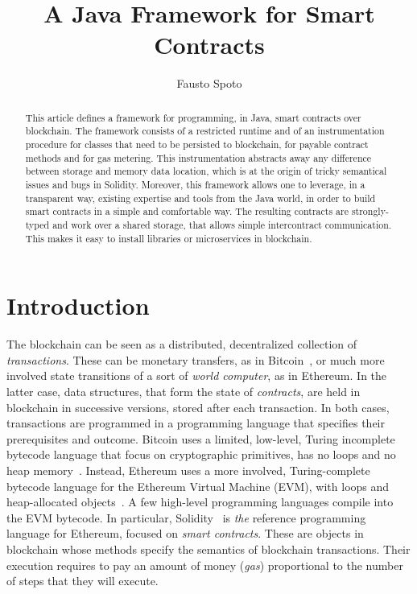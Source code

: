 \documentclass[10pt]{llncs}
\begin{document}
\title{
  A Java Framework for Smart Contracts}

\author{Fausto Spoto}


\maketitle

\begin{abstract}
  This article defines a framework for programming, in Java, smart contracts
  over blockchain.
  The framework consists of a restricted runtime and of an instrumentation
  procedure for classes that need to be persisted to blockchain,
  for payable contract methods and for gas metering.
  This instrumentation
  abstracts away any difference between storage and memory data location,
  which is at the origin of tricky semantical issues and bugs in Solidity.
  Moreover, this framework allows one to leverage, in a transparent way,
  existing expertise and tools from the Java world, in order to build
  smart contracts in a simple and comfortable way. The resulting contracts
  are strongly-typed and work over a shared storage, that allows simple
  intercontract communication.
  This makes it easy to install libraries
  or microservices in blockchain.
\end{abstract}

\section{Introduction}\label{sec:introduction}

The blockchain can be seen as a distributed, decentralized
collection of \emph{transactions}. These can be
monetary transfers, as in Bitcoin~\cite{Nakamoto08}, or much more
involved state transitions
of a sort of \emph{world computer}, as in Ethereum.
In the latter case, data structures, that form the state of \emph{contracts},
are held in blockchain in successive versions,
stored after each transaction. In both cases, transactions are
programmed in a programming language that specifies their prerequisites
and outcome. Bitcoin uses a limited, low-level,
Turing incomplete bytecode language that focus
on cryptographic primitives, has no loops and
no heap memory~\cite{Antonopoulos17}.
Instead, Ethereum uses a more involved,
Turing-complete bytecode language for the Ethereum Virtual Machine (EVM),
with loops and heap-allocated objects~\cite{AntonopoulosW18}. A few high-level
programming languages compile into the EVM bytecode. In particular,
Solidity~\cite{solidity}
is \emph{the} reference programming language for Ethereum,
focused on \emph{smart contracts}. These are objects
in blockchain whose methods specify the semantics of blockchain transactions.
Their execution requires to pay an amount of money (\emph{gas})
proportional to the number of steps that they will execute.
\end{document}
